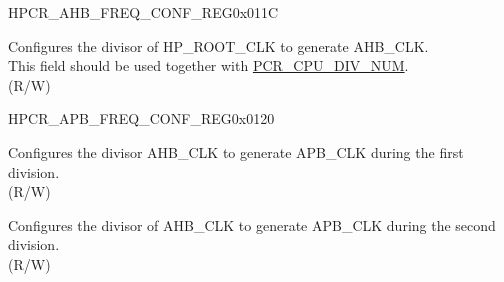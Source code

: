 \begin{register}{H}{PCR\_AHB\_FREQ\_CONF\_REG}{0x011C}\label{regdesc:PCRAHBFREQCONFREG}
%
%
\regnewline%
\begin{regdesc}\begin{reglist}
\label{fielddesc:PCRAHBDIVNUM}\item [PCR\_AHB\_DIV\_NUM] Configures the divisor of HP\_ROOT\_CLK to generate AHB\_CLK.\\
This field should be used together with \hyperref[fielddesc:PCRCPUDIVNUM]{PCR\_CPU\_DIV\_NUM}.\\ (R/W)
\end{reglist}\end{regdesc}
\end{register}


\begin{register}{H}{PCR\_APB\_FREQ\_CONF\_REG}{0x0120}\label{regdesc:PCRAPBFREQCONFREG}
%
%
%
\regnewline%
\begin{regdesc}\begin{reglist}
 \label{fielddesc:PCRAPBDECREASEDIVNUM}\item [PCR\_APB\_DECREASE\_DIV\_NUM] Configures the divisor AHB\_CLK to generate APB\_CLK during the first division.\\(R/W)
\label{fielddesc:PCRAPBDIVNUM}\item [PCR\_APB\_DIV\_NUM] Configures the divisor of AHB\_CLK to generate APB\_CLK during the second division.\\
(R/W)
\end{reglist}\end{regdesc}
\end{register}


